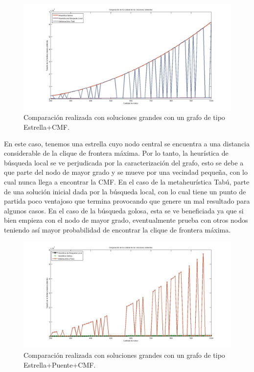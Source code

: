  \begin{figure}[H] %
\begin{center}
\includegraphics[width=400pt]{../imgs/calidadSolucionesGrandes15.jpg}
\caption{Comparación realizada con soluciones grandes con un grafo de tipo Estrella+CMF.}
\end{center}
\end{figure}

En este caso, tenemos una estrella cuyo nodo central se encuentra a una distancia considerable de la clique de frontera máxima. Por lo tanto, la heurística de búsqueda local se ve perjudicada por la caracterización del grafo, esto se debe a que parte del nodo de mayor grado y se mueve por una vecindad pequeña, con lo cual nunca llega a encontrar la CMF. En el caso de la metaheurística Tabú, parte de una solución inicial dada por la búsqueda local, con lo cual tiene un punto de partida poco ventajoso que termina provocando que genere un mal resultado para algunos casos. En el caso de la búsqueda golosa, esta se ve beneficiada ya que si bien empieza con el nodo de mayor grado, eventualmente prueba con otros nodos teniendo así mayor probabilidad de encontrar la clique de frontera máxima. 

 \begin{figure}[H] %
\begin{center}
\includegraphics[width=400pt]{../imgs/calidadSolucionesGrandes14.jpg}
\caption{Comparación realizada con soluciones grandes con un grafo de tipo Estrella+Puente+CMF.}
\end{center}
\end{figure}


